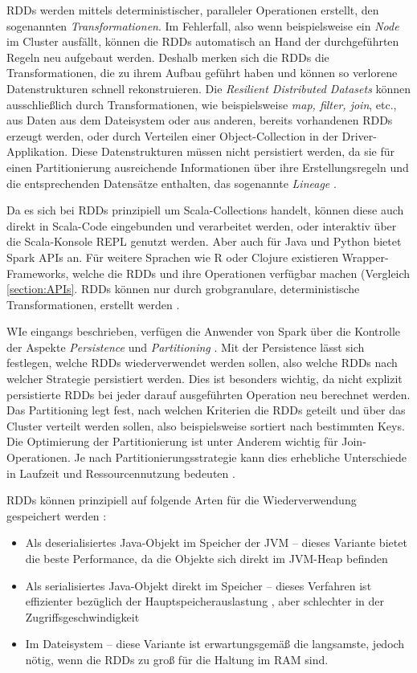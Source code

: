 RDDs werden mittels deterministischer, paralleler Operationen erstellt, den sogenannten \textit{Transformationen}. Im Fehlerfall, also wenn beispielsweise ein \textit{Node} im Cluster ausfällt, können die RDDs automatisch an Hand der durchgeführten Regeln neu aufgebaut werden. Deshalb merken sich die RDDs die Transformationen, die zu ihrem Aufbau geführt haben und können so verlorene Datenstrukturen schnell rekonstruieren. Die \textit{Resilient Distributed Datasets} können ausschließlich durch Transformationen, wie beispielsweise \textit{map, filter, join}, etc., aus Daten aus dem Dateisystem oder aus anderen, bereits vorhandenen RDDs erzeugt werden, oder durch Verteilen einer Object-Collection in der Driver-Applikation. Diese Datenstrukturen müssen nicht persistiert werden, da sie für einen Partitionierung ausreichende Informationen über ihre Erstellungsregeln und die entsprechenden Datensätze enthalten, das sogenannte \textit{Lineage} .   

Da es sich bei RDDs prinzipiell um Scala-Collections handelt, können diese auch direkt in Scala-Code eingebunden und verarbeitet werden, oder interaktiv über die Scala-Konsole REPL genutzt werden. Aber auch für Java und Python bietet Spark APIs an. Für weitere Sprachen wie R oder Clojure existieren Wrapper-Frameworks, welche die RDDs und ihre Operationen verfügbar machen (Vergleich \ref{section:APIs}. RDDs können nur durch grobgranulare, deterministische Transformationen, erstellt werden . 

WIe eingangs beschrieben, verfügen die Anwender von Spark über die Kontrolle der Aspekte \textit{Persistence} und \textit{Partitioning} . Mit der Persistence lässt sich festlegen, welche RDDs wiederverwendet werden sollen, also welche RDDs nach welcher Strategie persistiert werden. Dies ist besonders wichtig, da nicht explizit persistierte RDDs bei jeder darauf ausgeführten Operation neu berechnet werden. Das Partitioning legt fest, nach welchen Kriterien die RDDs geteilt und über das Cluster verteilt werden sollen, also beispielsweise sortiert nach bestimmten Keys. Die Optimierung der Partitionierung ist unter Anderem wichtig für Join-Operationen. Je nach Partitionierungsstrategie kann dies erhebliche Unterschiede in Laufzeit und Ressourcennutzung bedeuten .  

RDDs können prinzipiell auf folgende Arten für die Wiederverwendung gespeichert werden :
\begin{itemize}
		\item Als deserialisiertes Java-Objekt im Speicher der JVM – dieses Variante bietet die beste Performance, da die Objekte sich direkt im JVM-Heap befinden
		\item Als serialisiertes Java-Objekt direkt im Speicher – dieses Verfahren ist effizienter bezüglich der Hauptspeicherauslastung , aber schlechter in der Zugriffsgeschwindigkeit
		\item Im Dateisystem – diese Variante ist erwartungsgemäß die langsamste, jedoch nötig, wenn die RDDs zu groß für die Haltung im RAM sind. 		
\end{itemize}	

